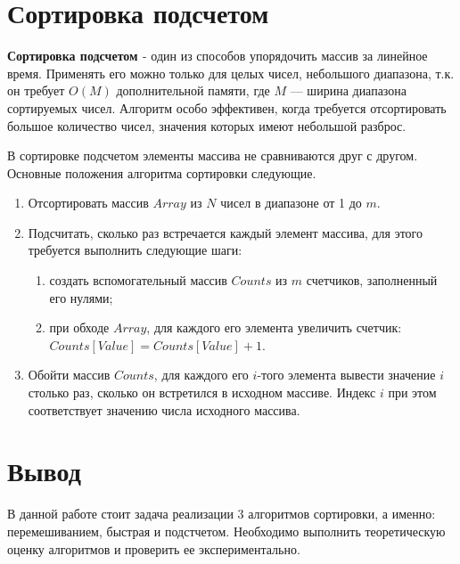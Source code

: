 \section{Сортировка подсчетом}

\textbf{Сортировка подсчетом \cite{select}} - один из способов упорядочить массив за линейное время. Применять его можно только для целых чисел, небольшого диапазона, т.к. он требует $O(M)$ дополнительной памяти, где $M$ — ширина диапазона сортируемых чисел. Алгоритм особо эффективен, когда требуется отсортировать большое количество чисел, значения которых имеют небольшой разброс.

В сортировке подсчетом элементы массива не сравниваются друг с другом. Основные положения алгоритма сортировки следующие.

\begin{enumerate}[label=\arabic*)]
	\item Отсортировать массив $Array$ из $N$ чисел в диапазоне от 1 до $m$.
	\item Подсчитать, сколько раз встречается каждый элемент массива, для этого требуется выполнить следующие шаги:
	\begin{enumerate}[label=2.\arabic*)]
		\item создать вспомогательный массив $Counts$ из $m$ счетчиков, заполненный его нулями;
		\item при обходе $Array$, для каждого его элемента увеличить счетчик: $Counts[Value] = Counts[Value] + 1$.
	\end{enumerate}
	\item Обойти массив $Counts$, для каждого его $i$-того элемента вывести значение $i$ столько раз, сколько он встретился в исходном массиве. Индекс $i$ при этом соответствует значению числа исходного массива.
\end{enumerate}

\section*{Вывод}

В данной работе стоит задача реализации 3 алгоритмов сортировки, а
именно: перемешиванием, быстрая и подстчетом. Необходимо выполнить теоретическую оценку алгоритмов и проверить ее экспериментально.



